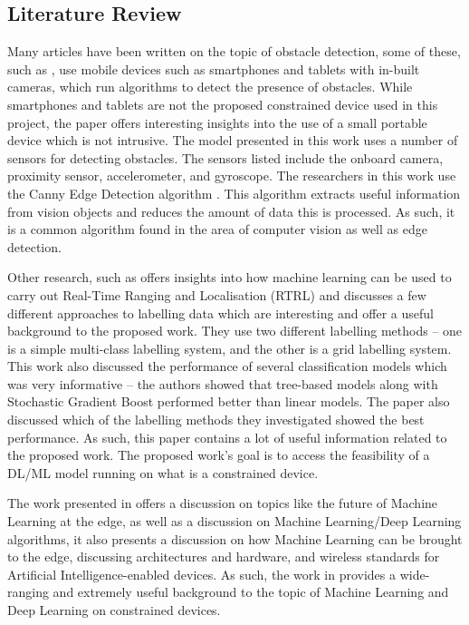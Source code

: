 \documentclass[conference]{IEEEtran}
\begin{document}
\subsection{Literature Review}
Many articles have been written on the topic of obstacle detection, some of these, such as \cite{obstacle1}, use mobile devices such as smartphones and tablets with in-built cameras, which run algorithms to detect the presence of obstacles. While smartphones and tablets are not the proposed constrained device used in this project, the paper offers interesting insights into the use of a small portable device which is not intrusive. The model presented in this work uses a number of sensors for detecting obstacles. The sensors listed include the onboard camera, proximity sensor, accelerometer, and gyroscope. The researchers in this work use the Canny Edge Detection algorithm \cite{canny}. This algorithm extracts useful information from vision objects and reduces the amount of data this is processed. As such, it is a common algorithm found in the area of computer vision as well as edge detection.

Other research, such as \cite{sattiraju2018machine} offers insights into how machine learning can be used to carry out Real-Time Ranging and Localisation (RTRL) and discusses a few different approaches to labelling data which are interesting and offer a useful background to the proposed work. They use two different labelling methods – one is a simple multi-class labelling system, and the other is a grid labelling system. This work also discussed the performance of several classification models which was very informative – the authors showed that tree-based models along with Stochastic Gradient Boost performed better than linear models. The paper also discussed which of the labelling methods they investigated showed the best performance. As such, this paper contains a lot of useful information related to the proposed work.
The proposed work’s goal is to access the feasibility of a DL/ML model running on what is a constrained device. 

The work presented in \cite{merenda} offers a discussion on topics like the future of Machine Learning at the edge, as well as a discussion on Machine Learning/Deep Learning algorithms, it also presents a discussion on how Machine Learning can be brought to the edge, discussing architectures and hardware, and wireless standards for Artificial Intelligence-enabled devices. As such, the work in \cite{merenda} provides a wide-ranging and extremely useful background to the topic of Machine Learning and Deep Learning on constrained devices. 
\end{document}
